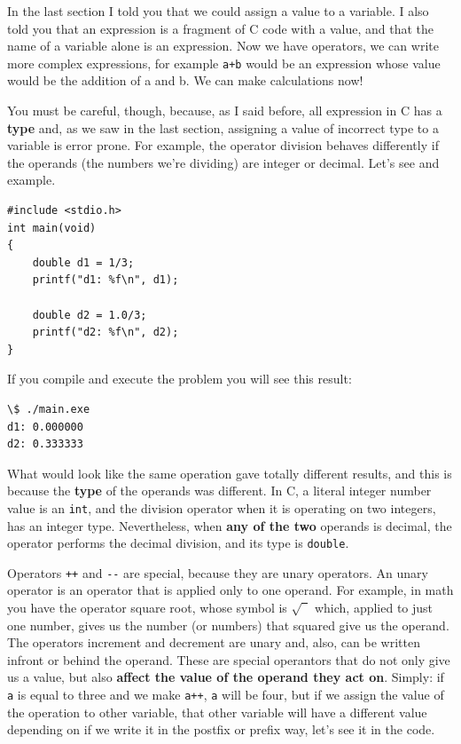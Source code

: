 \documentclass[a4paper]{article}
\begin{document}
In the last section I told you that we could assign a value to a variable.
I also told you that an expression is a fragment of C code with a value, and
that the name of a variable alone is an expression. Now we have operators, we
can write more complex expressions, for example \verb!a+b! would be an
expression whose value would be the addition of a and b.
We can make calculations now!

You must be careful, though, because, as I said before, all expression in C has
a \textbf{type} and, as we saw in the last section, assigning a value of
incorrect type to a variable is error prone. For example, the operator division
behaves differently if the operands (the numbers we're dividing) are integer or
decimal. Let's see and example.

\noindent
\begin{minipage}[H]{\linewidth}
\mbox{}
\begin{lstlisting}[style=C, caption={Integer division vs decimal division},
label={lst:decimalvsintergerDivision}]
#include <stdio.h>
int main(void)
{
    double d1 = 1/3;
    printf("d1: %f\n", d1);

    double d2 = 1.0/3;
    printf("d2: %f\n", d2);
}
\end{lstlisting}
\end{minipage}

If you compile and execute the problem you will see this result:

\noindent
\begin{minipage}[H]{\linewidth}
\mbox{}
\begin{lstlisting}[style=terminalStyle]
\$ ./main.exe
d1: 0.000000
d2: 0.333333
\end{lstlisting}
\end{minipage}

What would look like the same operation gave totally different results, and this
is because the \textbf{type} of the operands was different. In C, a literal
integer number value is an \texttt{int}, and the division operator when it
is operating on two integers, has an integer type. Nevertheless, when
\textbf{any of the two} operands is decimal, the operator performs the decimal
division, and its type is \texttt{double}.

Operators \verb!++! and \verb!--! are special, because they are unary operators.
An unary operator is an operator that is applied only to one operand. For
example, in math you have the operator square root, whose symbol is
$\sqrt{\phantom{2}}$ which, applied to just one number, gives us the number
(or numbers) that squared give us the operand. The operators increment and
decrement are unary and, also, can be written infront or behind the operand.
These are special operantors that do not only give us a value, but also
\textbf{affect the value of the operand they act on}. Simply: if \verb!a! is
equal to three and we make \verb!a++!, \verb!a! will be four, but if we assign
the value of the operation to other variable, that other variable will have
a different value depending on if we write it in the postfix or prefix way,
let's see it in the code.
\end{document}
